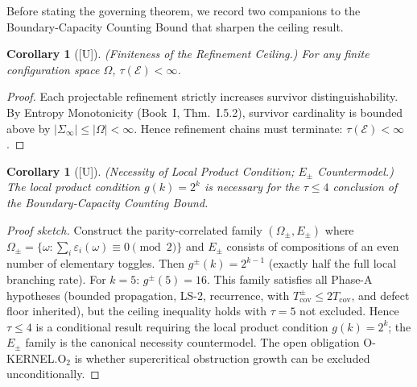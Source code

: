 \documentclass[12pt,oneside]{amsbook}
\theoremstyle{plain}
\newtheorem{corollary}[theorem]{Corollary}
\theoremstyle{definition}
\theoremstyle{remark}
\newcommand{\status}[1]{\textup{[#1]}}
\begin{document}

Before stating the governing theorem, we record two companions to the
Boundary-Capacity Counting Bound that sharpen the ceiling result.

\begin{corollary}[\status{U}]\label{cor:ceiling-finite}
\textup{(Finiteness of the Refinement Ceiling.)}  For any finite
configuration space $\Omega$, $\tau(\mathcal{E}) < \infty$.
\end{corollary}

\begin{proof}
Each projectable refinement strictly increases survivor
distinguishability.  By Entropy Monotonicity
(Book~I, Thm.~I.5.2), survivor cardinality is
bounded above by $|\Sigma_\infty| \leq |\Omega| < \infty$.  Hence
refinement chains must terminate: $\tau(\mathcal{E}) < \infty$.
\end{proof}

\begin{corollary}[\status{U}]\label{cor:Epm-necessity}
\textup{(Necessity of Local Product Condition; $E_\pm$ Countermodel.)}
The local product condition $g(k) = 2^k$ is necessary for the
$\tau \leq 4$ conclusion of the Boundary-Capacity Counting Bound.
\end{corollary}

\begin{proof}[Proof sketch]
Construct the parity-correlated family $(\Omega_\pm, E_\pm)$ where
$\Omega_\pm = \{\omega : \sum_i \varepsilon_i(\omega) \equiv 0
\pmod{2}\}$ and $E_\pm$ consists of compositions of an even number of
elementary toggles.  Then $g^\pm(k) = 2^{k-1}$ (exactly half the
full local branching rate).  For $k = 5$: $g^\pm(5) = 16$.  This
family satisfies all Phase-A hypotheses (bounded propagation, LS-2,
recurrence, with $T_{\mathrm{cov}}^\pm \leq 2T_{\mathrm{cov}}$, and
defect floor inherited), but the ceiling inequality holds with
$\tau = 5$ not excluded.  Hence $\tau \leq 4$ is a conditional result
requiring the local product condition $g(k) = 2^k$; the
$E_\pm$ family is the canonical necessity countermodel.  The open
obligation O-KERNEL.O${}_2$ is whether supercritical obstruction growth
can be excluded unconditionally.
\end{proof}

\end{document}

